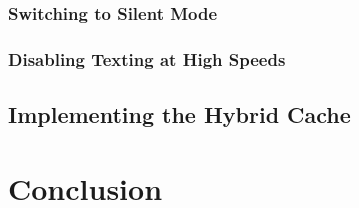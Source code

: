 \documentclass[12pt]{uthesis-v12}  %
\begin{document}
		\subsection{Switching to Silent Mode}
			
		\subsection{Disabling Texting at High Speeds}
		
	\section{Implementing the Hybrid Cache}

\chapter{Conclusion}		

\end{document}
